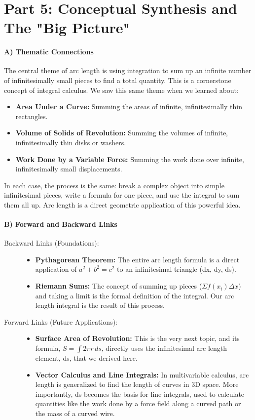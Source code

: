 \documentclass{article}
\begin{document}
\part*{Part 5: Conceptual Synthesis and The "Big Picture"}
\subsection*{A) Thematic Connections}
The central theme of arc length is using integration to sum up an infinite number of infinitesimally small pieces to find a total quantity. This is a cornerstone concept of integral calculus. We saw this same theme when we learned about:
\begin{itemize}
    \item \textbf{Area Under a Curve:} Summing the areas of infinite, infinitesimally thin rectangles.
    \item \textbf{Volume of Solids of Revolution:} Summing the volumes of infinite, infinitesimally thin disks or washers.
    \item \textbf{Work Done by a Variable Force:} Summing the work done over infinite, infinitesimally small displacements.
\end{itemize}
In each case, the process is the same: break a complex object into simple infinitesimal pieces, write a formula for one piece, and use the integral to sum them all up. Arc length is a direct geometric application of this powerful idea.

\subsection*{B) Forward and Backward Links}
\begin{description}
    \item[Backward Links (Foundations):]
    \begin{itemize}
        \item \textbf{Pythagorean Theorem:} The entire arc length formula is a direct application of $a^2 + b^2 = c^2$ to an infinitesimal triangle (dx, dy, ds).
        \item \textbf{Riemann Sums:} The concept of summing up pieces ($\Sigma f(x_i)\Delta x$) and taking a limit is the formal definition of the integral. Our arc length integral is the result of this process.
    \end{itemize}
    \item[Forward Links (Future Applications):]
    \begin{itemize}
        \item \textbf{Surface Area of Revolution:} This is the very next topic, and its formula, $S = \int 2\pi r \,ds$, directly uses the infinitesimal arc length element, ds, that we derived here.
        \item \textbf{Vector Calculus and Line Integrals:} In multivariable calculus, arc length is generalized to find the length of curves in 3D space. More importantly, ds becomes the basis for line integrals, used to calculate quantities like the work done by a force field along a curved path or the mass of a curved wire.
    \end{itemize}
\end{description}
\end{document}
